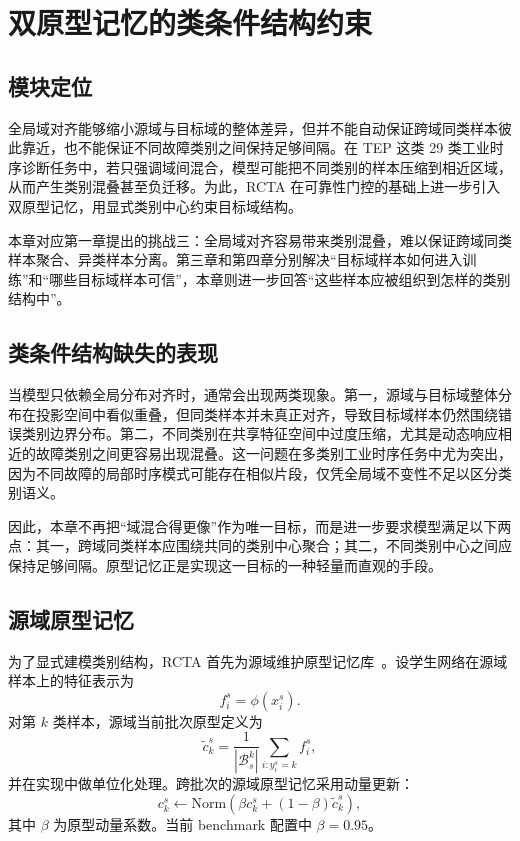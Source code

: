 \chapter{双原型记忆的类条件结构约束}

\section{模块定位}
全局域对齐能够缩小源域与目标域的整体差异，但并不能自动保证跨域同类样本彼此靠近，也不能保证不同故障类别之间保持足够间隔。在 TEP 这类 29 类工业时序诊断任务中，若只强调域间混合，模型可能把不同类别的样本压缩到相近区域，从而产生类别混叠甚至负迁移。为此，RCTA 在可靠性门控的基础上进一步引入双原型记忆，用显式类别中心约束目标域结构。

本章对应第一章提出的挑战三：全局域对齐容易带来类别混叠，难以保证跨域同类样本聚合、异类样本分离。第三章和第四章分别解决“目标域样本如何进入训练”和“哪些目标域样本可信”，本章则进一步回答“这些样本应被组织到怎样的类别结构中”。

\section{类条件结构缺失的表现}
当模型只依赖全局分布对齐时，通常会出现两类现象。第一，源域与目标域整体分布在投影空间中看似重叠，但同类样本并未真正对齐，导致目标域样本仍然围绕错误类别边界分布。第二，不同类别在共享特征空间中过度压缩，尤其是动态响应相近的故障类别之间更容易出现混叠。这一问题在多类别工业时序任务中尤为突出，因为不同故障的局部时序模式可能存在相似片段，仅凭全局域不变性不足以区分类别语义。

因此，本章不再把“域混合得更像”作为唯一目标，而是进一步要求模型满足以下两点：其一，跨域同类样本应围绕共同的类别中心聚合；其二，不同类别中心之间应保持足够间隔。原型记忆正是实现这一目标的一种轻量而直观的手段。

\section{源域原型记忆}
为了显式建模类别结构，RCTA 首先为源域维护原型记忆库~\cite{tanwisuth2021prototype}。设学生网络在源域样本上的特征表示为
\begin{equation}
f_i^s=\phi(x_i^s).
\end{equation}
对第 $k$ 类样本，源域当前批次原型定义为
\begin{equation}
\tilde{c}_{k}^{s}=
\frac{1}{|\mathcal{B}_{s}^{k}|}
\sum_{i:y_i^s=k} f_i^s,
\end{equation}
并在实现中做单位化处理。跨批次的源域原型记忆采用动量更新：
\begin{equation}
c_{k}^{s}\leftarrow
\mathrm{Norm}\!\left(
\beta c_k^s+(1-\beta)\tilde{c}_k^s
\right),
\end{equation}
其中 $\beta$ 为原型动量系数。当前 benchmark 配置中 $\beta=0.95$。

